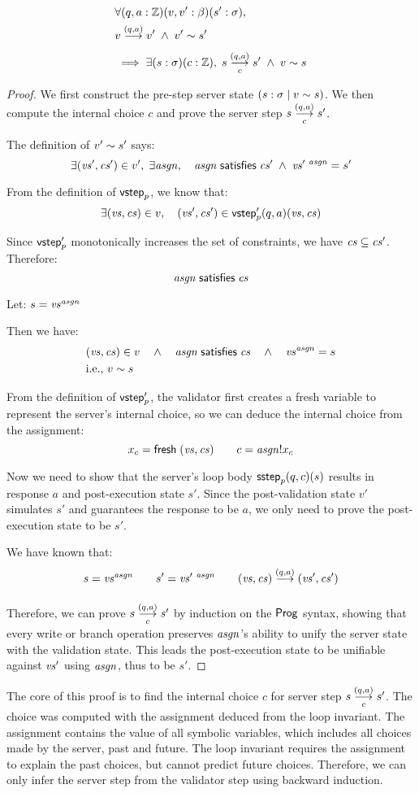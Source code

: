 \begin{lemma}[\ref{eq:rc2}]
\begin{align*}
&\forall(q,a:\Int)(v,v':\beta)(s':\sigma),\\
&\behaves v{(q,a)}v'\;\wedge\;\Reflects{v'}{s'}\\
&\implies\exists(s:\sigma)(c:\Int),\;\triggers sc{(q,a)}s'\;\wedge\;\Reflects{v}{s}
\end{align*}
\begin{proof}
We first construct the pre-step server state $(s:\sigma\mid v\sim s)$.
We then compute the internal choice $c$ and prove the server step $\triggers
sc{(q,a)}s'$.

The definition of $v'\sim s'$ says:
\[\exists (\mathit{vs}',\mathit{cs}')\in v',\;\exists \mathit{asgn},\quad \mathit{asgn}\;\mathsf{satisfies}\;\mathit{cs}'\;\wedge\;\mathit{vs}'^{~\mathit{asgn}}=s'\]

From the definition of $\mathsf{vstep}_p$, we know that:
\[\exists (\mathit{vs},\mathit{cs})\in v,\quad (\mathit{vs}',\mathit{cs}')\in\mathsf{vstep}'_p(q,a)(\mathit{vs},\mathit{cs})\]

Since $\mathsf{vstep}'_p$ monotonically increases the set of constraints, we have
$\mathit{cs}\subseteq \mathit{cs}'$.  Therefore: \[\mathit{asgn}\;\mathsf{satisfies}\;\mathit{cs}\]

Let: \(s=\mathit{vs}^{\mathit{asgn}}\)

Then we have:
\begin{align*}
&(\mathit{vs},\mathit{cs})\in v\quad\wedge\quad\mathit{asgn}\;\mathsf{satisfies}\;\mathit{cs}\quad\wedge\quad \mathit{vs}^{\mathit{asgn}}=s\\
&\text{i.e., }v\sim s
\end{align*}

From the definition of $\mathsf{vstep}'_p$, the validator first creates a fresh variable
to represent the server's internal choice, so we can deduce the internal choice
from the assignment:
\[x_c=\mathsf{fresh}\;(\mathit{vs},\mathit{cs})\qquad c=\mathit{asgn}!x_c\]

Now we need to show that the server's loop body $\mathsf{sstep}_p(q,c)(s)$ results in
response $a$ and post-execution state $s'$.  Since the post-validation state
$v'$ simulates $s'$ and guarantees the response to be $a$, we only need to prove
the post-execution state to be $s'$.

We have known that:
\[s=\vs^\asgn\qquad s'=\vs'^{~\asgn}\qquad\behaves{(\vs,\cs)}{(q,a)}{(\vs',\cs')}\]

Therefore, we can prove $\triggers sc{(q,a)}s'$ by induction on the $\mathsf{Prog}$
syntax, showing that every write or branch operation preserves $\mathit{asgn}$'s ability
to unify the server state with the validation state.  This leads the
post-execution state to be unifiable against $\mathit{vs}'$ using $\mathit{asgn}$, thus to be
$s'$.
\end{proof}

The core of this proof is to find the internal choice $c$ for server step
$\triggers sc{(q,a)}s'$.  The choice was computed with the assignment deduced
from the loop invariant.  The assignment contains the value of all symbolic
variables, which includes all choices made by the server, past and future.  The
loop invariant requires the assignment to explain the past choices, but cannot
predict future choices.  Therefore, we can only infer the server step from the
validator step using backward induction.
\end{lemma}

